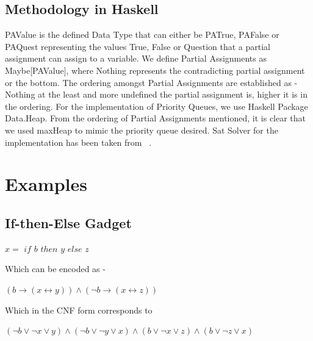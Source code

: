 \documentclass{article}
\theoremstyle{plain}
\begin{document}
\subsection{Methodology in Haskell}
PAValue is the defined Data Type that can either be PATrue, PAFalse or PAQuest representing the values True, False or Question that a partial assignment can assign to a variable. We define Partial Assignments as Maybe[PAValue], where Nothing represents the contradicting partial assignment or the bottom. The ordering amongst Partial Assignments are established as - Nothing at the least and more undefined the partial assignment is, higher it is in the ordering. For the implementation of Priority Queues, we use Haskell Package Data.Heap. From the ordering of Partial Assignments mentioned, it is clear that we used maxHeap to mimic the priority queue desired. Sat Solver for the implementation has been taken from ~\cite{sat.hs}.

\section{Examples}
\subsection{If-then-Else Gadget}
\begin{center}
$x = $ $if$ $b$ $then$ $y$ $else$ $z$
\end{center}
Which can be encoded as -
\begin{center}
$ (b \longrightarrow (x \longleftrightarrow y))  \wedge (\neg b \longrightarrow (x \longleftrightarrow z))$  
\end{center}
Which in the CNF form corresponds to
\begin{center}
$(\neg b \vee \neg x \vee y) \wedge (\neg b \vee \neg y \vee x) \wedge (b \vee \neg x \vee z) \wedge (b \vee \neg z \vee x)$
\end{center}
\nocite{*}


\end{document}
